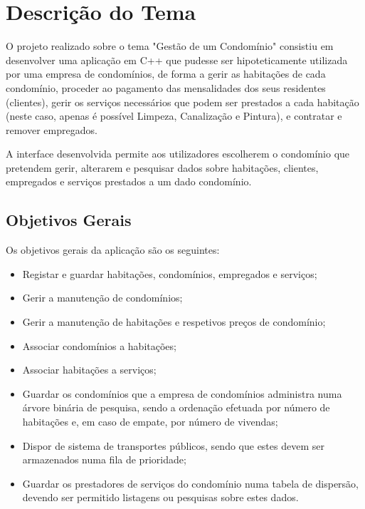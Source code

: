 \documentclass[a4paper]{article}
\begin{document}

\newpage

\tableofcontents

\newpage

\section{Descrição do Tema}

O projeto realizado sobre o tema "Gestão de um Condomínio" consistiu em desenvolver uma aplicação em C++ que pudesse ser hipoteticamente utilizada por uma empresa de condomínios, de forma a gerir as habitações de cada condomínio, proceder ao pagamento das mensalidades dos seus residentes (clientes), gerir os serviços necessários que podem ser prestados a cada habitação (neste caso, apenas é possível Limpeza, Canalização e Pintura), e contratar e remover empregados.

A interface desenvolvida permite aos utilizadores escolherem o condomínio que pretendem gerir, alterarem e pesquisar dados sobre habitações, clientes, empregados e serviços prestados a um dado condomínio.

\subsection{Objetivos Gerais}

Os objetivos gerais da aplicação são os seguintes:

\begin{itemize}

	\item Registar e guardar habitações, condomínios, empregados e serviços;
	\item Gerir a manutenção de condomínios;
	\item Gerir a manutenção de habitações e respetivos preços de condomínio;
	\item Associar condomínios a habitações;
	\item Associar habitações a serviços;
	\item Guardar os condomínios que a empresa de condomínios administra numa árvore binária de pesquisa, sendo a ordenação efetuada por número de habitações e, em caso de empate, por número de vivendas;
	\item Dispor de sistema de transportes públicos, sendo que estes devem ser armazenados numa fila de prioridade;
	\item Guardar os prestadores de serviços do condomínio numa tabela de dispersão, devendo ser permitido listagens ou pesquisas sobre estes dados.

\end{itemize}
\end{document}
